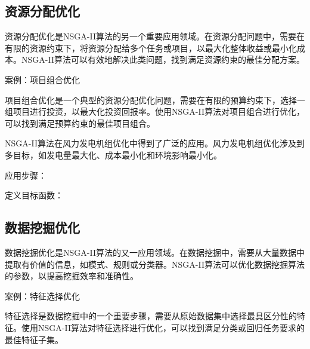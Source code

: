\documentclass[lang=cn,a4paper,citestyle=gb7714-2015, bibstyle=gb7714-2015]{elegantpaper}
\begin{document}
    \subsection{资源分配优化}

    资源分配优化是NSGA-II算法的另一个重要应用领域。在资源分配问题中，需要在有限的资源约束下，将资源分配给多个任务或项目，以最大化整体收益或最小化成本。NSGA-II算法可以有效地解决此类问题，找到满足资源约束的最佳分配方案。

    案例：项目组合优化

    项目组合优化是一个典型的资源分配优化问题，需要在有限的预算约束下，选择一组项目进行投资，以最大化投资回报率。使用NSGA-II算法对项目组合进行优化，可以找到满足预算约束的最佳项目组合。

    NSGA-II算法在风力发电机组优化中得到了广泛的应用。风力发电机组优化涉及到多目标，如发电量最大化、成本最小化和环境影响最小化。

    应用步骤：

    定义目标函数：

    \subsection{数据挖掘优化}
    数据挖掘优化是NSGA-II算法的又一应用领域。在数据挖掘中，需要从大量数据中提取有价值的信息，如模式、规则或分类器。NSGA-II算法可以优化数据挖掘算法的参数，以提高挖掘效率和准确性。

    案例：特征选择优化

    特征选择是数据挖掘中的一个重要步骤，需要从原始数据集中选择最具区分性的特征。使用NSGA-II算法对特征选择进行优化，可以找到满足分类或回归任务要求的最佳特征子集。


    \nocite{*}
    \printbibliography[heading=bibintoc, title=\ebibname]
\end{document}
